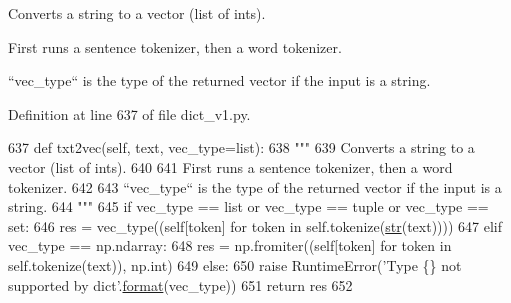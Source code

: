 \begin{DoxyVerb}Converts a string to a vector (list of ints).

First runs a sentence tokenizer, then a word tokenizer.

``vec_type`` is the type of the returned vector if the input is a string.
\end{DoxyVerb}
 

Definition at line 637 of file dict\+\_\+v1.\+py.


\begin{DoxyCode}
637     \textcolor{keyword}{def }txt2vec(self, text, vec\_type=list):
638         \textcolor{stringliteral}{"""}
639 \textcolor{stringliteral}{        Converts a string to a vector (list of ints).}
640 \textcolor{stringliteral}{}
641 \textcolor{stringliteral}{        First runs a sentence tokenizer, then a word tokenizer.}
642 \textcolor{stringliteral}{}
643 \textcolor{stringliteral}{        ``vec\_type`` is the type of the returned vector if the input is a string.}
644 \textcolor{stringliteral}{        """}
645         \textcolor{keywordflow}{if} vec\_type == list \textcolor{keywordflow}{or} vec\_type == tuple \textcolor{keywordflow}{or} vec\_type == set:
646             res = vec\_type((self[token] \textcolor{keywordflow}{for} token \textcolor{keywordflow}{in} self.tokenize(\hyperlink{namespacegenerate__task__READMEs_a5b88452ffb87b78c8c85ececebafc09f}{str}(text))))
647         \textcolor{keywordflow}{elif} vec\_type == np.ndarray:
648             res = np.fromiter((self[token] \textcolor{keywordflow}{for} token \textcolor{keywordflow}{in} self.tokenize(text)), np.int)
649         \textcolor{keywordflow}{else}:
650             \textcolor{keywordflow}{raise} RuntimeError(\textcolor{stringliteral}{'Type \{\} not supported by dict'}.\hyperlink{namespaceparlai_1_1chat__service_1_1services_1_1messenger_1_1shared__utils_a32e2e2022b824fbaf80c747160b52a76}{format}(vec\_type))
651         \textcolor{keywordflow}{return} res
652 
\end{DoxyCode}
\mbox{\label{classparlai_1_1agents_1_1legacy__agents_1_1seq2seq_1_1dict__v1_1_1DictionaryAgent_a8dd6e4af55a5f5d05d692198e044c5fe}} 
